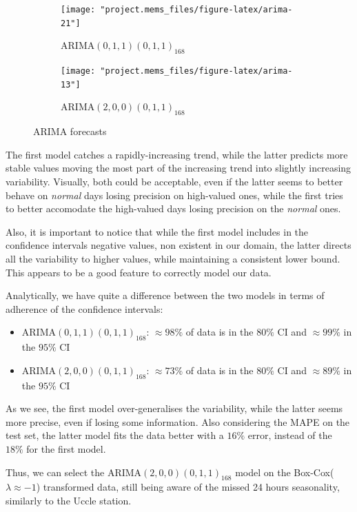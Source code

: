 \documentclass[12pt]{article}
\begin{document}
\begin{figure}[h]
	\begin{subfigure}{.5\linewidth}
		\texttt{[image: "project.mems\_files/figure-latex/arima-21"]}
		\caption{$\mathrm{ARIMA}(0,1,1)(0,1,1)_{168}$}
		\label{fig:mems:arima:011011}
	\end{subfigure}
	\begin{subfigure}{.5\linewidth}
		\texttt{[image: "project.mems\_files/figure-latex/arima-13"]}
		\caption{$\mathrm{ARIMA}(2,0,0)(0,1,1)_{168}$}
		\label{fig:mems:arima:200011}
	\end{subfigure}
	\caption{ARIMA forecasts}
	\label{fig:mems:arima}
\end{figure}
%
The first model catches a rapidly-increasing trend, while the latter predicts more stable values moving the most part of the increasing trend into slightly increasing variability. Visually, both could be acceptable, even if the latter seems to better behave on \textit{normal} days losing precision on high-valued ones, while the first tries to better accomodate the high-valued days losing precision on the \textit{normal} ones.

Also, it is important to notice that while the first model includes in the confidence intervals negative values, non existent in our domain, the latter directs all the variability to higher values, while maintaining a consistent lower bound. This appears to be a good feature to correctly model our data.

Analytically, we have quite a difference between the two models in terms of adherence of the confidence intervals:
\begin{itemize}[topsep=0.5em,itemsep=0em,partopsep=0.5em]
	\item $\mathrm{ARIMA}(0,1,1)(0,1,1)_{168}$: $\approx98\%$ of data is in the $80\%$ CI and $\approx99\%$ in the $95\%$ CI
	\item $\mathrm{ARIMA}(2,0,0)(0,1,1)_{168}$: $\approx73\%$ of data is in the $80\%$ CI and $\approx89\%$ in the $95\%$ CI
\end{itemize}
As we see, the first model over-generalises the variability, while the latter seems more precise, even if losing some information. Also considering the MAPE on the test set, the latter model fits the data better with a $16\%$ error, instead of the $18\%$ for the first model.
%

Thus, we can select the $\mathrm{ARIMA}(2,0,0)(0,1,1)_{168}$ model on the Box-Cox($\lambda\approx-1$) transformed data, still being aware of the missed 24 hours seasonality, similarly to the Uccle station.
\end{document}
